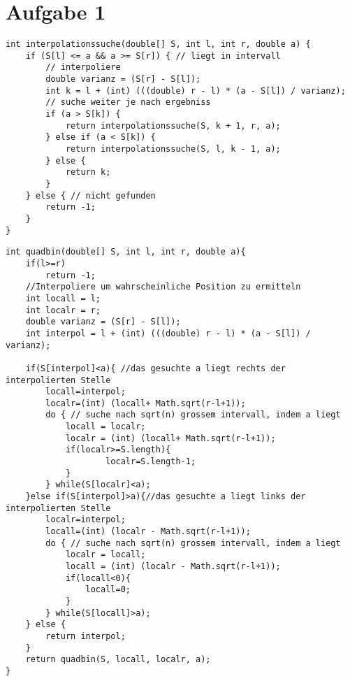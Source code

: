 




\newcommand{\nr}{4}


\section*{Aufgabe 1}
\begin{lstlisting}
int interpolationssuche(double[] S, int l, int r, double a) {
    if (S[l] <= a && a >= S[r]) { // liegt in intervall
        // interpoliere
        double varianz = (S[r] - S[l]);
        int k = l + (int) (((double) r - l) * (a - S[l]) / varianz);
        // suche weiter je nach ergebniss
        if (a > S[k]) {
            return interpolationssuche(S, k + 1, r, a);
        } else if (a < S[k]) {
            return interpolationssuche(S, l, k - 1, a);
        } else {
            return k;
        }
    } else { // nicht gefunden
        return -1;
    }
}
\end{lstlisting}
\begin{lstlisting}
int quadbin(double[] S, int l, int r, double a){
    if(l>=r)
        return -1;
    //Interpoliere um wahrscheinliche Position zu ermitteln
    int locall = l;
    int localr = r;
    double varianz = (S[r] - S[l]);
    int interpol = l + (int) (((double) r - l) * (a - S[l]) / varianz);

    if(S[interpol]<a){ //das gesuchte a liegt rechts der interpolierten Stelle
        locall=interpol;
        localr=(int) (locall+ Math.sqrt(r-l+1));
        do { // suche nach sqrt(n) grossem intervall, indem a liegt
            locall = localr;
            localr = (int) (locall+ Math.sqrt(r-l+1));
            if(localr>=S.length){
                    localr=S.length-1;
            }
        } while(S[localr]<a);
    }else if(S[interpol]>a){//das gesuchte a liegt links der interpolierten Stelle
        localr=interpol;
        locall=(int) (localr - Math.sqrt(r-l+1));
        do { // suche nach sqrt(n) grossem intervall, indem a liegt
            localr = locall;
            locall = (int) (localr - Math.sqrt(r-l+1));
            if(locall<0){
                locall=0;
            }
        } while(S[locall]>a);	
    } else {
        return interpol;
    }
    return quadbin(S, locall, localr, a);
}
\end{lstlisting}


